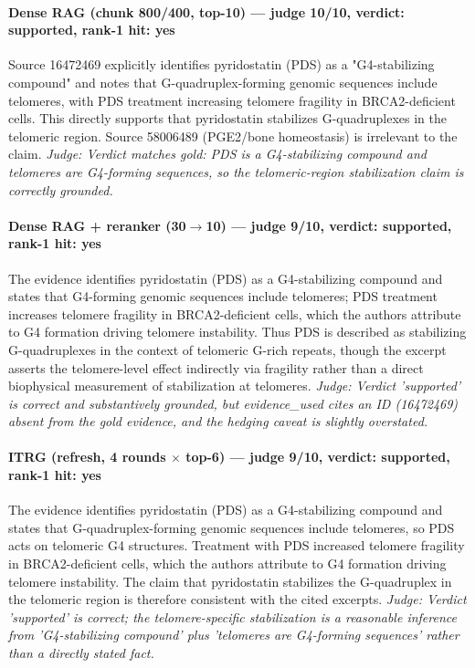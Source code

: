 \documentclass[sigconf, review, anonymous]{acmart}
\begin{document}
\paragraph{Dense RAG (chunk 800/400, top-10) --- judge 10/10, verdict: supported, rank-1 hit: yes}
\noindent Source 16472469 explicitly identifies pyridostatin (PDS) as a "G4-stabilizing compound" and notes that G-quadruplex-forming genomic sequences include telomeres, with PDS treatment increasing telomere fragility in BRCA2-deficient cells. This directly supports that pyridostatin stabilizes G-quadruplexes in the telomeric region. Source 58006489 (PGE2/bone homeostasis) is irrelevant to the claim.
\noindent\small\textit{Judge: Verdict matches gold: PDS is a G4-stabilizing compound and telomeres are G4-forming sequences, so the telomeric-region stabilization claim is correctly grounded.}
\paragraph{Dense RAG + reranker (30$\to$10) --- judge 9/10, verdict: supported, rank-1 hit: yes}
\noindent The evidence identifies pyridostatin (PDS) as a G4-stabilizing compound and states that G4-forming genomic sequences include telomeres; PDS treatment increases telomere fragility in BRCA2-deficient cells, which the authors attribute to G4 formation driving telomere instability. Thus PDS is described as stabilizing G-quadruplexes in the context of telomeric G-rich repeats, though the excerpt asserts the telomere-level effect indirectly via fragility rather than a direct biophysical measurement of stabilization at telomeres.
\noindent\small\textit{Judge: Verdict 'supported' is correct and substantively grounded, but evidence\_used cites an ID (16472469) absent from the gold evidence, and the hedging caveat is slightly overstated.}
\paragraph{ITRG (refresh, 4 rounds $\times$ top-6) --- judge 9/10, verdict: supported, rank-1 hit: yes}
\noindent The evidence identifies pyridostatin (PDS) as a G4-stabilizing compound and states that G-quadruplex-forming genomic sequences include telomeres, so PDS acts on telomeric G4 structures. Treatment with PDS increased telomere fragility in BRCA2-deficient cells, which the authors attribute to G4 formation driving telomere instability. The claim that pyridostatin stabilizes the G-quadruplex in the telomeric region is therefore consistent with the cited excerpts.
\noindent\small\textit{Judge: Verdict 'supported' is correct; the telomere-specific stabilization is a reasonable inference from 'G4-stabilizing compound' plus 'telomeres are G4-forming sequences' rather than a directly stated fact.}
\end{document}
